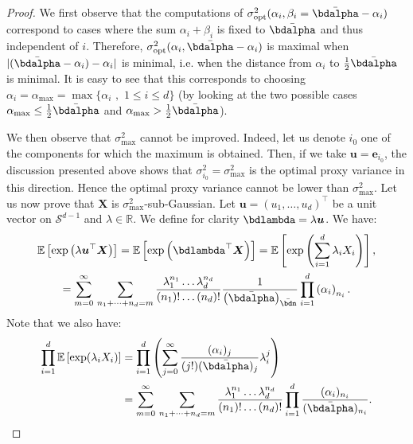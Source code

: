 \documentclass[15pt]{article}
\newcommand{\E}{\mathbb{E}}
\def\E{\mathbb{E}}
\theoremstyle{plain}
\begin{document}
\begin{proof}
We first observe that the computations of $\sigma^2_{\text{opt}}(\alpha_i,\beta_i=\bar{\bdalpha}-\alpha_i)$ correspond to cases where the sum $\alpha_i+\beta_i$ is fixed to $\bar{\bdalpha}$ and thus independent of $i$. Therefore, 
$\sigma^2_{\text{opt}}(\alpha_i,\bar{\bdalpha}-\alpha_i)$ is maximal when $|(\bar{\bdalpha}-\alpha_i)-\alpha_i|$ is minimal, i.e. when the distance from $\alpha_i$ to $\frac{1}{2}\bar{\bdalpha}$ is minimal. It is easy to see that this corresponds to choosing $\alpha_i = \alpha_{\text{max}} = \max\{\alpha_i\,\,,\,\, 1\leq i\leq d\}$  (by looking at the two possible cases $\alpha_{\text{max}}\leq \frac{1}{2}\bar{\bdalpha}$ and $\alpha_{\text{max}} > \frac{1}{2}\bar{\bdalpha}$).

We then observe that $\sigma^2_{\text{max}}$ cannot be improved. Indeed, let us denote $i_0$ one of the components for which the maximum is obtained. Then, if we take $\boldsymbol{u}=\boldsymbol{e}_{i_0}$, the discussion presented above shows that $\sigma_{i_0}^2=\sigma^2_{\text{max}}$ is the optimal proxy variance in this direction. Hence the optimal proxy variance cannot be lower than $\sigma^2_{\text{max}}$.\newline
Let us now prove that $\boldsymbol{X}$ is $\sigma^2_{\text{max}}$-sub-Gaussian. Let $\boldsymbol{u}=(u_1,\dots,u_d)^\top$ be a unit vector on $\mathcal{S}^{d-1}$ and $\lambda\in \mathbb{R}$. We define for clarity $\bdlambda=\lambda \boldsymbol{u}$. We have:
\begin{multline}
	\label{ExpectationProduct}\E\left[\exp\left(\lambda \boldsymbol{u}^\top \boldsymbol{X}\right)\right]=\E\left[\exp\left(\bdlambda^\top \boldsymbol{X}\right)\right]=\E\left[\exp\left(\sum_{i=1}^d\lambda_i X_i\right)\right],\\
=\sum_{m=0}^\infty\,\sum_{n_1+\dots+n_d=m}\frac{\lambda_1^{n_1}\dots \lambda_d^{n_d}}{(n_1)!\dots (n_d)!  }\frac{1}{\left(\bar{\bdalpha}\right)_{\bar{\bdn}}} \prod_{i=1}^d \left(\alpha_i\right)_{n_i}.
\end{multline}
Note that we also have:
\begin{align}
	\prod_{i=1}^d \E\left[\exp(\lambda_i X_i)\right]&=\prod_{i=1}^d \left(\sum_{j=0}^\infty \frac{(\alpha_i)_j}{(j!) (\bar{\bdalpha})_j}\lambda_i^j\right)\nonumber\\
&=\sum_{m=0}^\infty\,\sum_{n_1+\dots+n_d=m}\frac{\lambda_1^{n_1}\dots \lambda_d^{n_d}}{(n_1)!\dots (n_d)!  }\prod_{i=1}^d\frac{(\alpha_i)_{n_i}}{(\bar{\bdalpha})_{n_i}}.\label{ProductExpectation} 
\end{align}

\end{proof}
\end{document}
